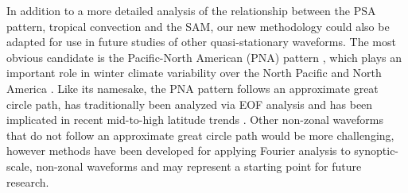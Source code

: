 In addition to a more detailed analysis of the relationship between the PSA pattern, tropical convection and the SAM, our new methodology could also be adapted for use in future studies of other quasi-stationary waveforms. The most obvious candidate is the Pacific-North American (PNA) pattern \citep{Wallace1981}, which plays an important role in winter climate variability over the North Pacific and North America \citep[e.g.][]{Notaro2006}. Like its namesake, the PNA pattern follows an approximate great circle path, has traditionally been analyzed via EOF analysis and has been implicated in recent mid-to-high latitude trends \citep[e.g.][]{Ding2014,Liu2015}. Other non-zonal waveforms that do not follow an approximate great circle path would be more challenging, however methods have been developed for applying Fourier analysis to synoptic-scale, non-zonal waveforms \citep{Zimin2006,Souders2014} and may represent a starting point for future research. 
